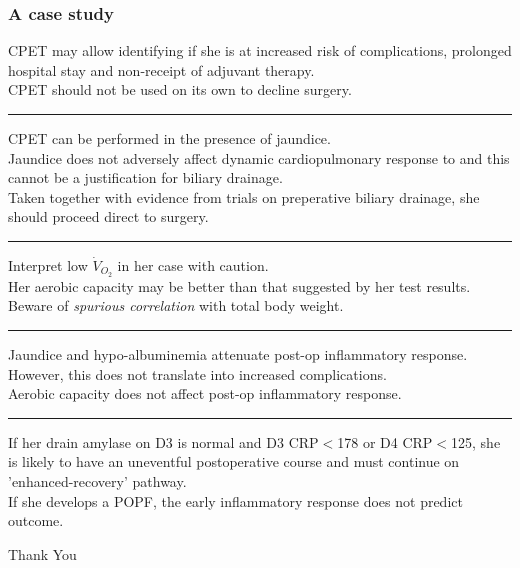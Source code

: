 \documentclass[10pt]{beamer}
\begin{document}
\begin{frame}
	\frametitle{A case study}
	\begin{description}
	{\scriptsize 	
		\item [Ch 2] CPET may allow identifying if she is at increased risk of complications, prolonged hospital stay and non-receipt of adjuvant therapy. 
					\\ CPET should not be used on its own to decline surgery. 
					\hrule
		\item [Ch 3] CPET can be performed in the presence of jaundice. 
					\\ Jaundice does not adversely affect dynamic cardiopulmonary response to and this cannot be a justification for biliary drainage. 
					\\ Taken together with evidence from trials on preperative biliary drainage, she should proceed direct to surgery.
						\hrule
		\item [Ch 4] Interpret low $\dot{V}_{O_2}$ in her case with caution. 
					\\ Her aerobic capacity may be better than that suggested by her test results. 
					\\ Beware of \textit{spurious correlation} with total body weight.
						\hrule
		\item [Ch 5] Jaundice and hypo-albuminemia attenuate post-op inflammatory response.
					\\ However, this does not translate into increased complications. 
					\\ Aerobic capacity does not affect post-op inflammatory response.
						\hrule
		\item [Ch 6] If her drain amylase on D3 is normal and D3 CRP$<$178 or D4 CRP$<$125, she is likely to have an uneventful postoperative course and must continue on 'enhanced-recovery' pathway.
				\\ If she develops a POPF, the early inflammatory response does not predict outcome.
	}
	\end{description}
\end{frame}

\begin{frame}
\centerline{Thank You}
\end{frame}
\end{document}
